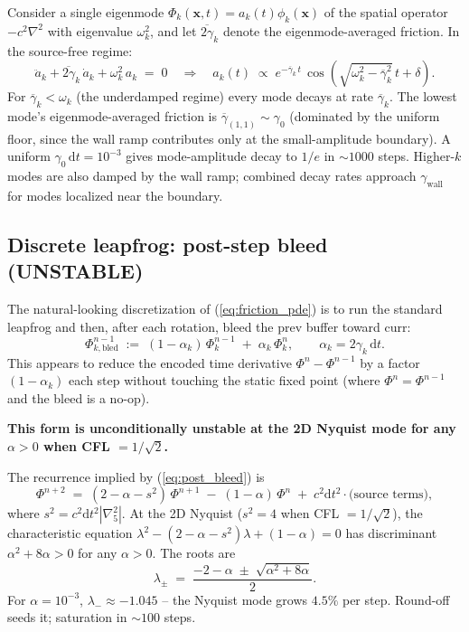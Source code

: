 \documentclass[11pt,a4paper]{article}
\newcommand{\vv}[1]{\mathbf{#1}}
\newcommand{\dd}{\mathrm{d}}
\begin{document}
Consider a single eigenmode $\Phi_k(\vv{x},t) = a_k(t)\phi_k(\vv{x})$
of the spatial operator $-c^2\nabla^2$ with eigenvalue $\omega_k^2$,
and let $\overline{2\gamma}_k$ denote the eigenmode-averaged
friction.  In the source-free regime:
\begin{equation}
  \ddot a_k + \overline{2\gamma}_k\,\dot a_k + \omega_k^2\,a_k \;=\; 0
  \quad\Longrightarrow\quad
  a_k(t) \;\propto\; e^{-\overline{\gamma}_k\,t}\,\cos(\sqrt{\omega_k^2 - \overline{\gamma}_k^2}\,t + \delta).
\end{equation}
For $\overline{\gamma}_k < \omega_k$ (the underdamped regime) every
mode decays at rate $\overline{\gamma}_k$.  The lowest mode's
eigenmode-averaged friction is
$\overline{\gamma}_{(1,1)} \sim \gamma_0$ (dominated by the uniform
floor, since the wall ramp contributes only at the small-amplitude
boundary).  A uniform $\gamma_0\,\dd t = 10^{-3}$ gives mode-amplitude
decay to $1/e$ in $\sim 1000$ steps.  Higher-$k$ modes are also
damped by the wall ramp; combined decay rates approach $\gamma_\text{wall}$
for modes localized near the boundary.

\subsection{Discrete leapfrog: post-step bleed (UNSTABLE)}

The natural-looking discretization of (\ref{eq:friction_pde}) is to
run the standard leapfrog and then, after each rotation, bleed the
prev buffer toward curr:
\begin{equation}
  \Phi^{n-1}_{k,\text{bled}} \;:=\; (1-\alpha_k)\,\Phi^{n-1}_k \;+\; \alpha_k\,\Phi^n_k,
  \qquad \alpha_k = 2\gamma_k\,\dd t.
  \label{eq:post_bleed}
\end{equation}
This appears to reduce the encoded time derivative $\Phi^n - \Phi^{n-1}$
by a factor $(1-\alpha_k)$ each step without touching the static
fixed point (where $\Phi^n = \Phi^{n-1}$ and the bleed is a no-op).

\textbf{This form is unconditionally unstable at the 2D Nyquist mode
for any $\alpha > 0$ when CFL $= 1/\sqrt{2}$.}

The recurrence implied by (\ref{eq:post_bleed}) is
\begin{equation}
  \Phi^{n+2} \;=\; (2 - \alpha - s^2)\,\Phi^{n+1} \;-\; (1-\alpha)\,\Phi^n
  \;+\; c^2\dd t^2 \cdot \text{(source terms)},
\end{equation}
where $s^2 = c^2 \dd t^2 |\nabla^2_5|$.  At the 2D Nyquist
($s^2 = 4$ when CFL $= 1/\sqrt{2}$), the characteristic equation
$\lambda^2 - (2-\alpha-s^2)\lambda + (1-\alpha) = 0$ has discriminant
$\alpha^2 + 8\alpha > 0$ for any $\alpha > 0$.  The roots are
\begin{equation}
  \lambda_{\pm} \;=\; \frac{-2 - \alpha \;\pm\; \sqrt{\alpha^2 + 8\alpha}}{2}.
\end{equation}
For $\alpha = 10^{-3}$, $\lambda_- \approx -1.045$ -- the Nyquist
mode grows $4.5\%$ per step.  Round-off seeds it; saturation in
$\sim 100$ steps.
\end{document}
